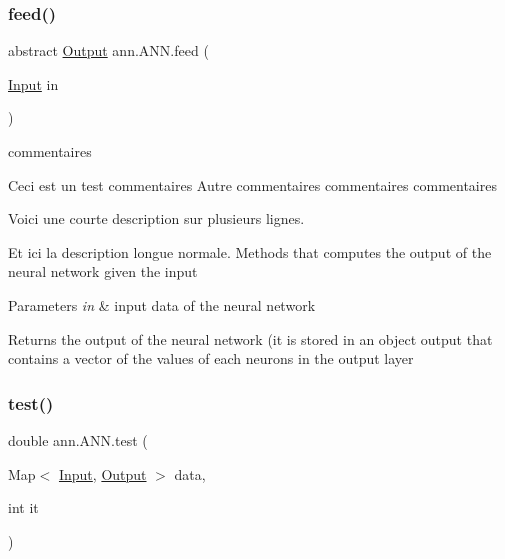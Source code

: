 \subsubsection{\texorpdfstring{feed()}{feed()}}
{\footnotesize\ttfamily abstract \hyperlink{classann_1_1_output}{Output} ann.\+A\+N\+N.\+feed (\begin{DoxyParamCaption}\item[{\hyperlink{classann_1_1_input}{Input}}]{in }\end{DoxyParamCaption})\hspace{0.3cm}{\ttfamily [abstract]}}



commentaires 

Ceci est un test commentaires Autre commentaires commentaires commentaires

Voici une courte description sur plusieurs lignes.

Et ici la description longue normale. Methods that computes the output of the neural network given the input 
\begin{DoxyParams}{Parameters}
{\em in} & input data of the neural network \\
\hline
\end{DoxyParams}
\begin{DoxyReturn}{Returns}
the output of the neural network (it is stored in an object output that contains a vector of the values of each neurons in the output layer 
\end{DoxyReturn}
\mbox{\label{classann_1_1_a_n_n_aa7ab72312b84e639aa84b6fbee5c9df1}} 
\subsubsection{\texorpdfstring{test()}{test()}}
{\footnotesize\ttfamily double ann.\+A\+N\+N.\+test (\begin{DoxyParamCaption}\item[{Map$<$ \hyperlink{classann_1_1_input}{Input}, \hyperlink{classann_1_1_output}{Output} $>$}]{data,  }\item[{int}]{it }\end{DoxyParamCaption})}

